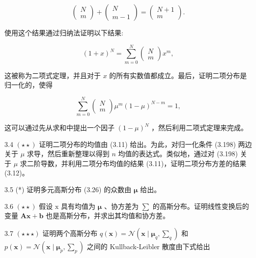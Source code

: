 \documentclass[10pt]{report}
\begin{document}
\[
\left( \begin{array}{l} N \\  m \end{array}\right)  + \left( \begin{matrix} N \\  m - 1 \end{matrix}\right)  = \left( \begin{matrix} N + 1 \\  m \end{matrix}\right) . \tag{3.196}
\]

使用这个结果通过归纳法证明以下结果:

\[
{\left( 1 + x\right) }^{N} = \mathop{\sum }\limits_{{m = 0}}^{N}\left( \begin{array}{l} N \\  m \end{array}\right) {x}^{m}, \tag{3.197}
\]

这被称为二项式定理，并且对于 \(x\) 的所有实数值都成立。最后，证明二项分布是归一化的，使得

\[
\mathop{\sum }\limits_{{m = 0}}^{N}\left( \begin{array}{l} N \\  m \end{array}\right) {\mu }^{m}{\left( 1 - \mu \right) }^{N - m} = 1, \tag{3.198}
\]

这可以通过先从求和中提出一个因子 \({\left( 1 - \mu \right) }^{N}\) ，然后利用二项式定理来完成。

3.4 \(\left( {\star  \star  }\right)\) 证明二项分布的均值由 (3.11) 给出。为此，对归一化条件 (3.198) 两边关于 \(\mu\) 求导，然后重新整理以得到 \(n\) 均值的表达式。类似地，通过对 (3.198) 关于 \(\mu\) 求二阶导数，并利用二项分布均值的结果 (3.11)，证明二项分布方差的结果 (3.12)。

3.5 (*) 证明多元高斯分布 (3.26) 的众数由 \(\mathbf{\mu }\) 给出。

3.6 \(\left( {\star  \star  }\right)\) 假设 \(\mathrm{x}\) 具有均值为 \(\mathbf{\mu }\) 、协方差为 \(\mathbf{\sum }\) 的高斯分布。证明线性变换后的变量 \(\mathbf{{Ax}} + \mathbf{b}\) 也是高斯分布，并求出其均值和协方差。

3.7 \(\left( {\star  \star   \star  }\right)\) 证明两个高斯分布 \(q\left( \mathbf{x}\right)  = \mathcal{N}\left( {\mathbf{x} \mid  {\mathbf{\mu }}_{q},{\mathbf{\sum }}_{q}}\right)\) 和 \(p\left( \mathbf{x}\right)  = \mathcal{N}\left( {\mathbf{x} \mid  {\mathbf{\mu }}_{p},{\mathbf{\sum }}_{p}}\right)\) 之间的 Kullback-Leibler 散度由下式给出
\end{document}
